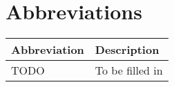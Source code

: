 \section*{Abbreviations}

\begin{longtable}[l]{p{} p{}}
    \textbf{Abbreviation} & \textbf{Description} \\
    \hline
    TODO & To be filled in \\
    \hline
\end{longtable}